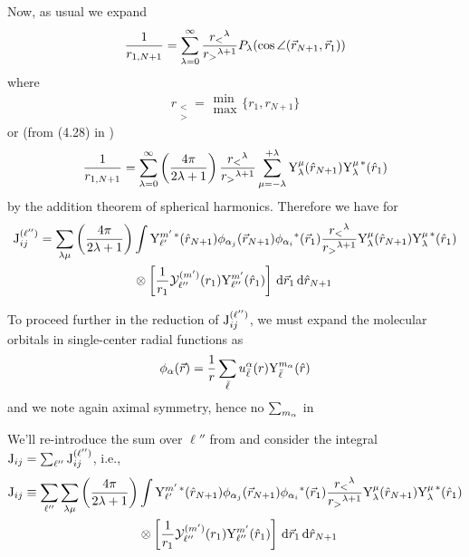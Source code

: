 \documentclass[aps,pra,groupedaddress,12pt,
               amsfonts,amssymb,
               preprint
    ]{revtex4}
\begin{document}
Now, as usual we expand
\begin{equation}
  \label{eq:rijexp}
  \dfrac{1}{r_{1,N+1}} = \sum_{\lambda=0}^{\infty} 
                   \dfrac{r_<{}^\lambda}{r_>{}^{\lambda+1}}
                   P_\lambda(\cos\angle(\vec{r}_{N+1},\vec{r}_1))
\end{equation}
where
\begin{equation}
   r_{\substack{< \\ >}} = \substack{\min \\ \max}\big\{r_1,r_{N+1}\big\}
\end{equation}
or (from (4.28) in \cite{MER1957})
\begin{equation}
  \label{eq:rexp}
  \dfrac{1}{r_{1,N+1}} =
  \sum_{\lambda=0}^{\infty}\left(\dfrac{4\pi}{2\lambda+1}\right)
  \dfrac{r_<{}^\lambda}{r_>{}^{\lambda+1}}\sum_{\mu=-\lambda}^{+\lambda}
  \mathrm{Y}_{\lambda}^{\mu}(\hat{r}_{N+1})\mathrm{Y}_{\lambda}^{\mu\,*}(\hat{r}_{1})
\end{equation}
by the addition theorem of spherical harmonics. Therefore we have for
\begin{equation}
  \label{eq:Iexlld}
  \begin{split}
  \mathrm{J}_{ij}^{(\ell'')} = \sum_{\lambda\mu}\left(\dfrac{4\pi}{2\lambda+1}\right)
  & \int\mathrm{Y}_{\ell'}^{m'\,*}(\hat{r}_{N+1})\phi_{\alpha_j}(\vec{r}_{N+1})\phi_{\alpha_i}{}^*(\vec{r}_1)\dfrac{r_<{}^\lambda}{r_>{}^{\lambda+1}}\mathrm{Y}_{\lambda}^{\mu}(\hat{r}_{N+1})\mathrm{Y}_{\lambda}^{\mu\,*}(\hat{r}_{1}) \\
  & \otimes\left[\dfrac{1}{r_1}\mathcal{Y}_{\ell''}^{(m')}(r_1)\mathrm{Y}_{\ell''}^{m'}(\hat{r}_1)\right]\,\mathrm{d}\vec{r}_1\,\mathrm{d}\hat{r}_{N+1}
  \end{split}
\end{equation}

To proceed further in the reduction of $\mathrm{J}_{ij}^{(\ell'')}$, we must
expand the molecular orbitals in single-center radial functions as
\begin{equation}
  \label{eq:moexp}
  \phi_\alpha(\vec{r})=\dfrac{1}{r}\sum_{\bar{\ell}}u_{\bar{\ell}}^{\alpha}(r)\mathrm{Y}_{\bar{\ell}}^{m_\alpha}(\hat{r})
\end{equation}
and we note again aximal symmetry, hence no $\sum_{m_\alpha}$ in

We'll re-introduce the sum over $\ell''$ from  and consider the
integral $\mathrm{J}_{ij} = \sum_{\ell''}\mathrm{J}_{ij}^{(\ell'')}$, i.e.,
\begin{equation}
  \label{eq:Iexb}
  \begin{split}
  \mathrm{J}_{ij} \equiv \sum_{\ell''}\sum_{\lambda\mu}\left(\dfrac{4\pi}{2\lambda+1}\right)
  & \int\mathrm{Y}_{\ell'}^{m'\,*}(\hat{r}_{N+1})\phi_{\alpha_j}(\vec{r}_{N+1})\phi_{\alpha_i}{}^*(\vec{r}_1)\dfrac{r_<{}^\lambda}{r_>{}^{\lambda+1}}\mathrm{Y}_{\lambda}^{\mu}(\hat{r}_{N+1})\mathrm{Y}_{\lambda}^{\mu\,*}(\hat{r}_{1}) \\
  & \otimes\left[\dfrac{1}{r_1}\mathcal{Y}_{\ell''}^{(m')}(r_1)\mathrm{Y}_{\ell''}^{m'}(\hat{r}_1)\right]\,\mathrm{d}\vec{r}_1\,\mathrm{d}\hat{r}_{N+1}
  \end{split}
\end{equation}
\end{document}

